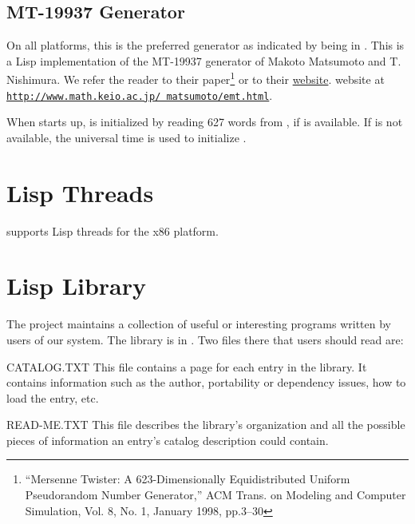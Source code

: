 \subsection{MT-19937 Generator}
On all platforms, this is the preferred generator as indicated by
 being in .  This is a Lisp
implementation of the MT-19937 generator of Makoto Matsumoto and
T. Nishimura.  We refer the reader to their paper\footnote{``Mersenne
  Twister: A 623-Dimensionally Equidistributed Uniform Pseudorandom
  Number Generator,'' ACM Trans. on Modeling and Computer Simulation,
  Vol. 8, No. 1, January 1998, pp.3--30} or to
their
\ifpdf
\href{http://www.math.sci.hiroshima-u.ac.jp/~m-mat/MT/emt.html}{website}.
\else
website at
\href{http://www.math.keio.ac.jp/~matumoto/emt.html}{\texttt{http://www.math.keio.ac.jp/~matsumoto/emt.html}}.
\fi

When \cmucl{} starts up,  is initialized by
reading 627 words from , if  is
available.  If  is not available, the universal
time is used to initialize .

\section{Lisp Threads}

\cmucl{} supports Lisp threads for the x86 platform.

\section{Lisp Library}
\label{lisp-lib}

The \cmucl{} project maintains a collection of useful or interesting
programs written by users of our system.  The library is in
.  Two files there that users should read are:
\begin{Lentry}

\item[CATALOG.TXT]
This file contains a page for each entry in the library.  It
contains information such as the author, portability or dependency issues, how
to load the entry, etc.

\item[READ-ME.TXT]
This file describes the library's organization and all the
possible pieces of information an entry's catalog description could contain.
\end{Lentry}


